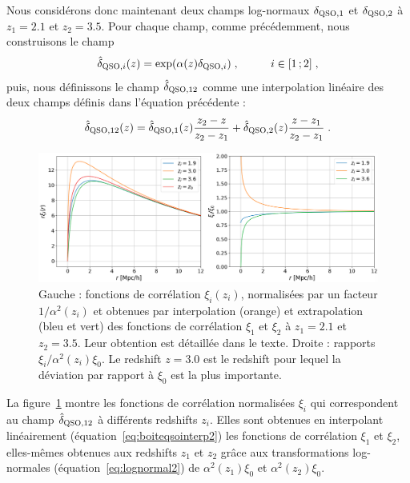 Nous considérons donc maintenant deux champs log-normaux $\delta_{\textsc{QSO},1}$ et $\delta_{\textsc{QSO},2}$ à $z_1 = \num{2.1}$ et $z_2 = \num{3.5}$. Pour chaque champ, comme précédemment, nous construisons le champ
\begin{equation}
  \label{eq:boiteqsointerp1}
  \hat  \delta_{\textsc{QSO}, i}(z) = \exp(\alpha(z) \delta_{\textsc{QSO},i}) \; ,
  \hspace{1cm} i \in [1\, ; 2] \; ,
\end{equation}
puis, nous définissons le champ $\hat \delta_{\textsc{QSO}, 12}$ comme une interpolation linéaire des deux champs définis dans l'équation précédente :
\begin{equation}
  \label{eq:boiteqsointerp2}
  \hat \delta_{\textsc{QSO}, 12}(z) = \hat \delta_{\textsc{QSO}, 1}(z) \frac{z_2 - z}{z_2 - z_1} + \hat \delta_{\textsc{QSO}, 2}(z) \frac{z - z_1}{z_2 - z_1} \; .
\end{equation}
\begin{figure}
  \centering
  \includegraphics[scale=0.4]{qsolognormal2}
  \caption{Gauche : fonctions de corrélation $\xi_{i}(z_i)$, normalisées par un facteur $1 / \alpha^2(z_i)$ et obtenues par interpolation (orange) et extrapolation (bleu et vert) des fonctions de corrélation $\xi_1$ et $\xi_2$ à $z_1 = \num{2.1}$ et $z_2 = \num{3.5}$. Leur obtention est détaillée dans le texte. Droite : rapports $\xi_i / \alpha^2(z_i) \xi_0$. Le redshift $z = \num{3.0}$ est le redshift pour lequel la déviation par rapport à $\xi_0$ est la plus importante.}
  \label{fig:qsolognormal2}
\end{figure}
La figure~\ref{fig:qsolognormal2} montre les fonctions de corrélation normalisées $\xi_i$ qui correspondent au champ $\hat \delta_{\textsc{QSO},12}$ à différents redshifts $z_i$. Elles sont obtenues en interpolant linéairement (équation~\ref{eq:boiteqsointerp2}) les fonctions de corrélation $\xi_1$ et $\xi_2$, elles-mêmes obtenues aux redshifts $z_1$ et $z_2$ grâce aux transformations log-normales (équation~\ref{eq:lognormal2}) de $\alpha^2(z_1)\xi_0$ et $\alpha^2(z_2)\xi_0$.
